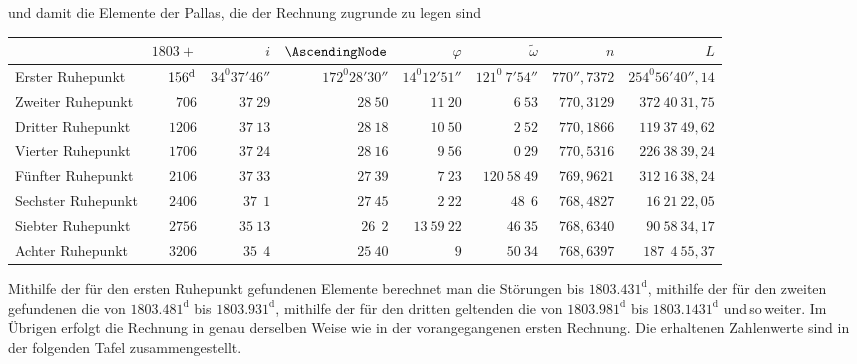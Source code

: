 \begin{landscape}
\noindent und damit die Elemente der Pallas, die der Rechnung zugrunde zu legen sind
\begingroup
\fontsize{9}{11}\selectfont
\setlength{\tabcolsep}{3pt}
\begin{center}
\begin{tabular}{@{}l|r|r|r|r|r|r|r@{}}
 & \(1803+\) & \(i\) & \(\AscendingNode\) & \(\varphi\) & \(\widetilde\omega\) & \(n\) & \(L\)\\[3pt]
\hline
Erster Ruhepunkt & \(156^{\rm d}\) & \(34^{0}37'46''\) & \(172^{0}28'30''\) & \(14^{0}12'51''\) & \(121^{0}\ 7'54''\) & \(770'',7372\) & \(254^{0}56'40'',14\)\\[3pt]
Zweiter Ruhepunkt & \(706\) & \(37\ 29\) & \(28\ 50\) & \(11\ 20\) & \(\ 6\ 53\) & \(770{,}3129\) & \(372\ 40\ 31,75\)\\[3pt]
Dritter Ruhepunkt & \(1206\) & \(37\ 13\) & \(28\ 18\) & \(10\ 50\) & \(\ 2\ 52\) & \(770{,}1866\) & \(119\ 37\ 49,62\)\\[3pt]
Vierter Ruhepunkt & \(1706\) & \(37\ 24\) & \(28\ 16\) & \(\ 9\ 56\) & \(\ 0\ 29\) & \(770{,}5316\) & \(226\ 38\ 39,24\)\\[3pt]
Fünfter Ruhepunkt & \(2106\) & \(37\ 33\) & \(27\ 39\) & \(\ 7\ 23\) & \(120\ 58\ 49\) & \(769{,}9621\) & \(312\ 16\ 38,24\)\\[3pt]
Sechster Ruhepunkt & \(2406\) & \(37\ \ 1\) & \(27\ 45\) & \(\ 2\ 22\) & \(\ 48\ \ 6\) & \(768{,}4827\) & \(16\ 21\ 22,05\)\\[3pt]
Siebter Ruhepunkt & \(2756\) & \(35\ 13\) & \(26\ \ 2\) & \(13\ 59\ 22\) & \(46\ 35\) & \(768{,}6340\) & \(90\ 58\ 34,17\)\\[3pt]
Achter Ruhepunkt & \(3206\) & \(35\ \ 4\) & \(25\ 40\) & \(9\) & \(50\ 34\) & \(768{,}6397\) & \(187\ \ 4\ 55,37\)\\[3pt]
\end{tabular}
\end{center}
\endgroup
\end{landscape}
\par
Mithilfe der für den ersten Ruhepunkt gefundenen Elemente berechnet man die Störungen bis \(1803.431^{\text{d}}\), mithilfe der für den zweiten gefundenen die von \(1803.481^{\text{d}}\) bis \(1803.931^{\text{d}}\), mithilfe der für den dritten geltenden die von \(1803.981^{\text{d}}\) bis \(1803.1431^{\text{d}}\) und\,so\,weiter. Im Übrigen erfolgt die Rechnung in     genau derselben Weise wie in der vorangegangenen ersten Rechnung. Die erhaltenen Zahlenwerte sind in der folgenden Tafel zusammengestellt.
